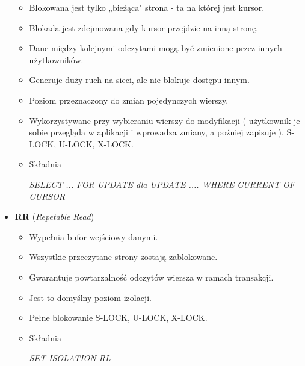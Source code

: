 \documentclass[a4paper,twoside]{article}
\begin{document}
\begin{itemize}
\begin{itemize}
  			\item Blokowana jest tylko „bieżąca" strona - ta na której jest kursor.
  			\item Blokada jest zdejmowana gdy kursor przejdzie na inną stronę.
  			\item Dane między kolejnymi odczytami mogą być zmienione przez innych użytkowników.               \item Generuje duży ruch na sieci, ale nie blokuje dostępu innym.
  			\item Poziom przeznaczony do zmian pojedynczych wierszy.
  			\item Wykorzystywane przy wybieraniu wierszy do modyfikacji ( użytkownik je sobie przegląda w aplikacji i wprowadza zmiany, a poźniej zapisuje ). S-LOCK, U-LOCK, X-LOCK.
  			\item Składnia\\
  			\centerline{\emph{SELECT ... FOR UPDATE dla UPDATE .... WHERE CURRENT OF CURSOR}}
  		\end{itemize}
  		\item \textbf{RR} (\emph{Repetable Read})
  		\begin{itemize}
  			\item Wypełnia bufor wejściowy danymi.
  			\item Wszystkie przeczytane strony zostają zablokowane.
  			\item Gwarantuje powtarzalność odczytów wiersza w ramach transakcji.
  			\item Jest to domyślny poziom izolacji.
  			\item Pełne blokowanie S-LOCK, U-LOCK, X-LOCK.
  			\item Składnia\\
  			\centerline{\emph{SET ISOLATION RL}}
  		\end{itemize}
  	\end{itemize}
  	
  	
\end{document}
